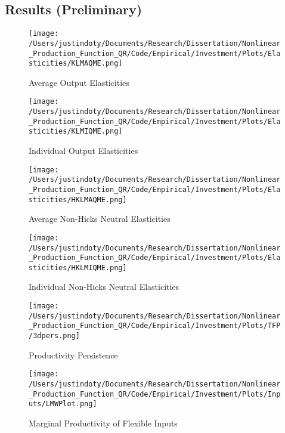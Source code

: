 \documentclass{article}
\begin{document}
\subsection{Results (Preliminary)}

\begin{figure}[H]
\centering
\caption{Average Output Elasticities}
\texttt{[image: /Users/justindoty/Documents/Research/Dissertation/Nonlinear\_Production\_Function\_QR/Code/Empirical/Investment/Plots/Elasticities/KLMAQME.png]}
\label{klmaqme}
\end{figure} 

\begin{figure}[H]
\centering
\caption{Individual Output Elasticities}
\texttt{[image: /Users/justindoty/Documents/Research/Dissertation/Nonlinear\_Production\_Function\_QR/Code/Empirical/Investment/Plots/Elasticities/KLMIQME.png]}
\label{klmiqme}
\end{figure} 

\begin{figure}[H]
\centering
\caption{Average Non-Hicks Neutral Elasticities}
\texttt{[image: /Users/justindoty/Documents/Research/Dissertation/Nonlinear\_Production\_Function\_QR/Code/Empirical/Investment/Plots/Elasticities/HKLMAQME.png]}
\label{hklmaqme}
\end{figure} 

\begin{figure}[H]
\centering
\caption{Individual Non-Hicks Neutral Elasticities}
\texttt{[image: /Users/justindoty/Documents/Research/Dissertation/Nonlinear\_Production\_Function\_QR/Code/Empirical/Investment/Plots/Elasticities/HKLMIQME.png]}
\label{hklmiqme}
\end{figure}

\begin{figure}[H]
\centering
\caption{Productivity Persistence}
\texttt{[image: /Users/justindoty/Documents/Research/Dissertation/Nonlinear\_Production\_Function\_QR/Code/Empirical/Investment/Plots/TFP/3dpers.png]}
\label{pers}
\end{figure}

\begin{figure}[H]
\centering
\caption{Marginal Productivity of Flexible Inputs}
\texttt{[image: /Users/justindoty/Documents/Research/Dissertation/Nonlinear\_Production\_Function\_QR/Code/Empirical/Investment/Plots/Inputs/LMWPlot.png]}
\label{lmw}
\end{figure}
\end{document}
